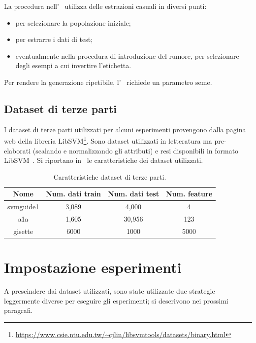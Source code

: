 La procedura nell'~ utilizza delle estrazioni casuali in diversi punti:
\begin{itemize}
    \item per selezionare la popolazione iniziale;
    \item per estrarre i dati di test;
    \item eventualmente nella procedura di introduzione del rumore, per selezionare degli esempi a cui invertire l'etichetta.
\end{itemize}
Per rendere la generazione ripetibile, l'~ richiede un parametro seme.


\subsection{Dataset di terze parti}
I dataset di terze parti utilizzati per alcuni esperimenti provengono dalla pagina web della libreria LibSVM\footnote{\url{https://www.csie.ntu.edu.tw/~cjlin/libsvmtools/datasets/binary.html}}.
Sono dataset utilizzati in letteratura ma pre-elaborati (scalando e normalizzando gli attributi) e resi disponibili in formato LibSVM~\cite{libsvm}.
Si riportano in~ le caratteristiche dei dataset utilizzati.
\begin{table}
    \centering
    \begin{tabular}{cccc}
        \toprule
        Nome & Num. dati train & Num. dati test & Num. feature\\
        \midrule
        svmguide1 &  3,089 & 4,000 & 4 \\
        a1a & 1,605	& 30,956 & 123\\
        gisette & 6000 & 1000 & 5000 \\
        \bottomrule
    \end{tabular}
    \caption{Caratteristiche dataset di terze parti.}
    \label{tab:uci_datasets}
\end{table}


\section{Impostazione esperimenti}
A prescindere dai dataset utilizzati, sono state utilizzate due strategie leggermente diverse per eseguire gli esperimenti; si descrivono nei prossimi paragrafi.

